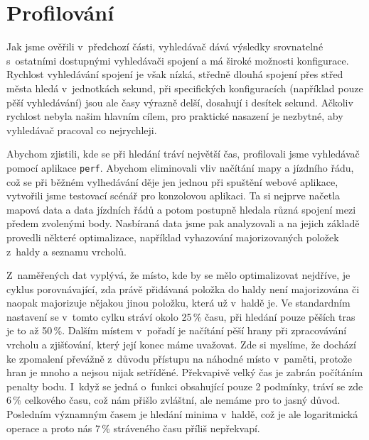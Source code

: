 \section{Profilování}
Jak jsme ověřili v~předchozí části, vyhledávač dává výsledky srovnatelné
s~ostatními dostupnými vyhledávači spojení a má široké možnosti konfigurace.
Rychlost vyhledávání spojení je však nízká, středně dlouhá spojení přes střed
města hledá v~jednotkách sekund, při specifických konfiguracích (například pouze
pěší vyhledávání) jsou ale časy výrazně delší, dosahují i desítek sekund.
Ačkoliv rychlost nebyla našim hlavním cílem, pro praktické nasazení je nezbytné,
aby vyhledávač pracoval co nejrychleji. 

Abychom zjistili, kde se při hledání tráví největší čas, profilovali jsme
vyhledávač pomocí aplikace {\tt perf}. Abychom eliminovali vliv načítání mapy a
jízdního řádu, což se při běžném vylhedávání děje jen jednou při spuštění webové
aplikace, vytvořili jsme testovací scénář pro konzolovou aplikaci. Ta si nejprve
načetla mapová data a data jízdních řádů a potom postupně hledala různá spojení
mezi předem zvolenými body. Nasbíraná data jsme pak analyzovali a na jejich
základě provedli některé optimalizace, například vyhazování majorizovaných
položek z~haldy a seznamu vrcholů.

Z~naměřených dat vyplývá, že místo, kde by se mělo optimalizovat nejdříve, je
cyklus porovnávající, zda právě přidávaná položka do haldy není majorizována či
naopak majorizuje nějakou jinou položku, která už v~haldě je. Ve standardním
nastavení se v~tomto cylku stráví okolo 25\,\% času, při hledání pouze pěších
tras je to až 50\,\%. Dalším místem v~pořadí je načítání pěší hrany při
zpracovávání vrcholu a zjišťování, který její konec máme uvažovat. Zde si
myslíme, že dochází ke zpomalení převážně z~důvodu přístupu na náhodné místo
v~paměti, protože hran je mnoho a nejsou nijak setříděné. Překvapivě velký čas je
zabrán počítáním penalty bodu. I~když se jedná o~funkci obsahující pouze 2
podmínky, tráví se zde 6\,\% celkového času, což nám přišlo zvláštní, ale nemáme
pro to jasný důvod. Posledním významným časem je hledání minima v~haldě, což je
ale logaritmická operace a proto nás 7\,\% stráveného času příliš nepřekvapí.


